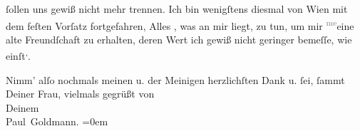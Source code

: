 \pstart
           \label{K_L03254-3v}\label{K_L03254-3}{ }ſollen uns gewiß nicht mehr trennen. Ich bin wenigſtens diesmal von
                  Wien mit dem feſten Vorſatz fortgefahren, Alles
                  , was an mir liegt, zu tun, um mir \substVorne{}\textsuperscript{\textcolor{gray}{me}}\substDazwischen{}eine\substHinten{} alte Freundſchaft zu erhalten, deren Wert ich gewiß nicht geringer bemeſſe,
               wie einſt\substVorne{}\textsuperscript{,}\substDazwischen{}.\substHinten{}\pend
           
\pstart
           Nimm’ alſo nochmals meinen u. der Meinigen herzlichſten Dank u.{ }ſei,{ }ſammt
               Deiner Frau, vielmals gegrüßt
               von {\\[\baselineskip]}Deinem {\\[\baselineskip]}\spacefill\mbox{Paul Goldmann.}\pend
           \leftskip=0em{}\endnumbering{}  \newcommand{\dateiname}{L03254}\newcommand{\titel}{Paul Goldmann an Arthur Schnitzler, 7. 7. 1907}\newcommand{\editorInnen}{Martin Anton Müller und Laura Untner}
